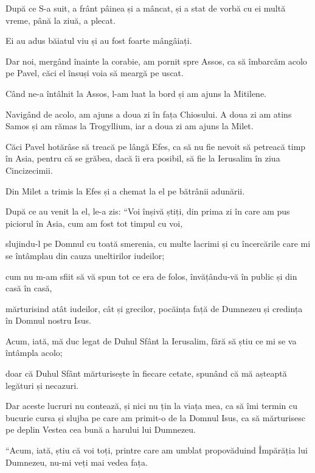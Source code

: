 {\par }{\PP {}După ce S-a suit, a frânt pâinea și a mâncat, și a stat de vorbă cu ei multă vreme, până la ziuă, a plecat.

Ei au adus băiatul viu și au fost foarte mângâiați.


\par }{\PP {}Dar noi, mergând înainte la corabie, am pornit spre Assos, ca să îmbarcăm acolo pe Pavel, căci el însuși voia să meargă pe uscat.

Când ne-a întâlnit la Assos, l-am luat la bord și am ajuns la Mitilene.

Navigând de acolo, am ajuns a doua zi în fața Chiosului. A doua zi am atins Samos și am rămas la Trogyllium, iar a doua zi am ajuns la Milet.

Căci Pavel hotărâse să treacă pe lângă Efes, ca să nu fie nevoit să petreacă timp în Asia, pentru că se grăbea, dacă îi era posibil, să fie la Ierusalim în ziua Cincizecimii.


\par }{\PP {}Din Milet a trimis la Efes și a chemat la el pe bătrânii adunării.

După ce au venit la el, le-a zis: “Voi înșivă știți, din prima zi în care am pus piciorul în Asia, cum am fost tot timpul cu voi,

slujindu-l pe Domnul cu toată smerenia, cu multe lacrimi și cu încercările care mi se întâmplau din cauza uneltirilor iudeilor;

cum nu m-am sfiit să vă spun tot ce era de folos, învățându-vă în public și din casă în casă,

mărturisind atât iudeilor, cât și grecilor, pocăința față de Dumnezeu și credința în Domnul nostru Isus.

Acum, iată, mă duc legat de Duhul Sfânt la Ierusalim, fără să știu ce mi se va întâmpla acolo;

doar că Duhul Sfânt mărturisește în fiecare cetate, spunând că mă așteaptă legături și necazuri.

Dar aceste lucruri nu contează, și nici nu țin la viața mea, ca să îmi termin cu bucurie cursa și slujba pe care am primit-o de la Domnul Isus, ca să mărturisesc pe deplin Vestea cea bună a harului lui Dumnezeu.


\par }{\PP {}“Acum, iată, știu că voi toți, printre care am umblat propovăduind Împărăția lui Dumnezeu, nu-mi veți mai vedea fața.

}
